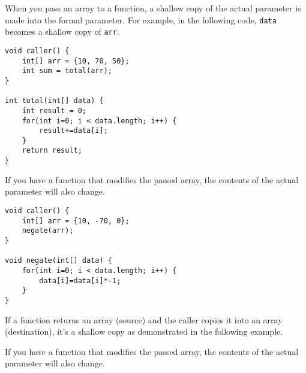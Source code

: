 \documentclass[abstracton]{scrartcl}
\begin{document}
When you pass an array to a function, a shallow copy of the actual parameter is made into the formal parameter. For example, in the following code, \texttt{data} becomes a shallow copy of \texttt{arr}.

\begin{lstlisting}
void caller() {
	int[] arr = {10, 70, 50};
	int sum = total(arr);
}

int total(int[] data) {
	int result = 0;
	for(int i=0; i < data.length; i++) {
		result+=data[i];
	}
	return result;
}
\end{lstlisting}

\bgroup \tikzset{png export}  \egroup


If you have a function that modifies the passed array, the contents of the actual parameter will also change.

\begin{lstlisting}
void caller() {
	int[] arr = {10, -70, 0};
	negate(arr);
}

void negate(int[] data) {
	for(int i=0; i < data.length; i++) {
		data[i]=data[i]*-1;
	}
}
\end{lstlisting}

\bgroup \tikzset{png export}  \egroup

If a function returns an array (source) and the caller copies it into an array (destination), it's a shallow copy as demonstrated in the following example.

If you have a function that modifies the passed array, the contents of the actual parameter will also change.
\end{document}
